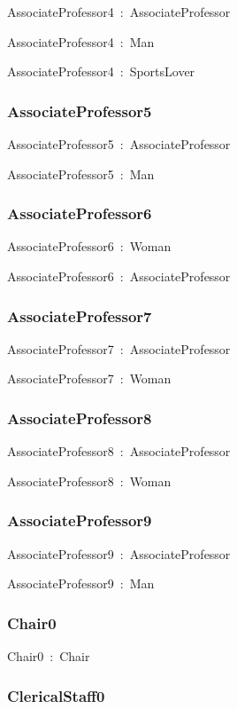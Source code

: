 \documentclass{article}
\begin{document}
AssociateProfessor4~:~AssociateProfessor

AssociateProfessor4~:~Man

AssociateProfessor4~:~SportsLover

\subsubsection*{AssociateProfessor5}

AssociateProfessor5~:~AssociateProfessor

AssociateProfessor5~:~Man

\subsubsection*{AssociateProfessor6}

AssociateProfessor6~:~Woman

AssociateProfessor6~:~AssociateProfessor

\subsubsection*{AssociateProfessor7}

AssociateProfessor7~:~AssociateProfessor

AssociateProfessor7~:~Woman

\subsubsection*{AssociateProfessor8}

AssociateProfessor8~:~AssociateProfessor

AssociateProfessor8~:~Woman

\subsubsection*{AssociateProfessor9}

AssociateProfessor9~:~AssociateProfessor

AssociateProfessor9~:~Man

\subsubsection*{Chair0}

Chair0~:~Chair

\subsubsection*{ClericalStaff0}
\end{document}
